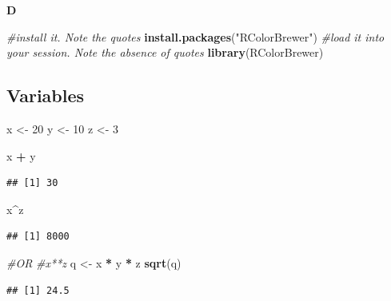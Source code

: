 \documentclass[]{book}
\newenvironment{Shaded}{\begin{snugshade}}{\end{snugshade}}
\newcommand{\CommentTok}[1]{\textcolor[rgb]{0.56,0.35,0.01}{\textit{#1}}}
\newcommand{\DecValTok}[1]{\textcolor[rgb]{0.00,0.00,0.81}{#1}}
\newcommand{\KeywordTok}[1]{\textcolor[rgb]{0.13,0.29,0.53}{\textbf{#1}}}
\newcommand{\NormalTok}[1]{#1}
\newcommand{\OperatorTok}[1]{\textcolor[rgb]{0.81,0.36,0.00}{\textbf{#1}}}
\newcommand{\StringTok}[1]{\textcolor[rgb]{0.31,0.60,0.02}{#1}}
\begin{document}
\textbf{D}

\begin{Shaded}
\begin{Highlighting}[]
\CommentTok{#install it. Note the quotes}
\KeywordTok{install.packages}\NormalTok{(}\StringTok{"RColorBrewer"}\NormalTok{)}
\CommentTok{#load it into your session. Note the absence of quotes}
\KeywordTok{library}\NormalTok{(RColorBrewer)}
\end{Highlighting}
\end{Shaded}

\hypertarget{variables-2}{%
\subsection{Variables}\label{variables-2}}

\begin{Shaded}
\begin{Highlighting}[]
\NormalTok{x <-}\StringTok{ }\DecValTok{20}
\NormalTok{y <-}\StringTok{ }\DecValTok{10}
\NormalTok{z <-}\StringTok{ }\DecValTok{3}

\NormalTok{x }\OperatorTok{+}\StringTok{ }\NormalTok{y}
\end{Highlighting}
\end{Shaded}

\begin{verbatim}
## [1] 30
\end{verbatim}

\begin{Shaded}
\begin{Highlighting}[]
\NormalTok{x}\OperatorTok{^}\NormalTok{z}
\end{Highlighting}
\end{Shaded}

\begin{verbatim}
## [1] 8000
\end{verbatim}

\begin{Shaded}
\begin{Highlighting}[]
\CommentTok{#OR}
\CommentTok{#x**z}
\NormalTok{q <-}\StringTok{ }\NormalTok{x }\OperatorTok{*}\StringTok{ }\NormalTok{y }\OperatorTok{*}\StringTok{ }\NormalTok{z}
\KeywordTok{sqrt}\NormalTok{(q)}
\end{Highlighting}
\end{Shaded}

\begin{verbatim}
## [1] 24.5
\end{verbatim}
\end{document}
